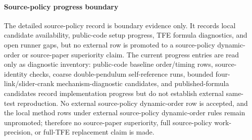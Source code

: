 \documentclass[preprint,12pt]{elsarticle}
\newcommand{\tfe}{TFE}
\begin{document}
\paragraph{Source-policy progress boundary}
The detailed source-policy record is boundary evidence only. It records local
candidate availability, public-code setup progress, \tfe{} formula diagnostics,
and open runner gaps, but no external row is promoted to a source-policy
dynamic-order or source-paper superiority claim.
The current progress entries are read only as diagnostic inventory: public-code
baseline order/timing rows, source-identity checks, coarse double-pendulum
self-reference runs, bounded four-link/slider-crank mechanism-diagnostic candidates, and
published-formula candidates record implementation progress but do not
establish external same-test reproduction.  No external source-policy
dynamic-order row is accepted, and the local method rows under external
source-policy dynamic-order rules remain unpromoted; therefore no
source-paper superiority, full source-policy work-precision, or full-\tfe{}
replacement claim is made.
\end{document}
